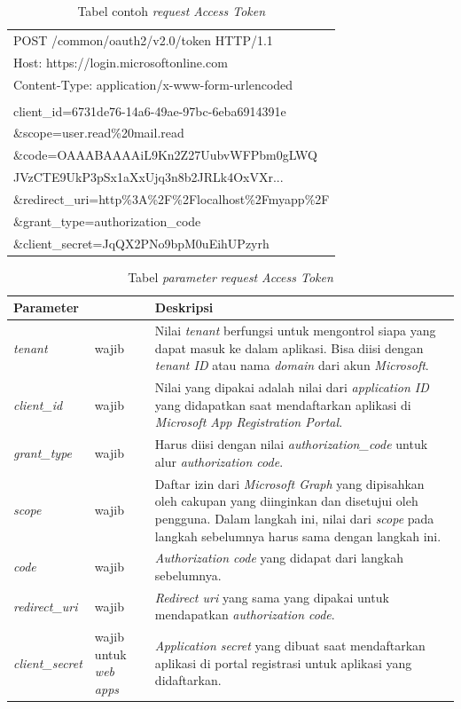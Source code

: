 \begin{table}[H]
	\centering 
	\caption{Tabel contoh \textit{request} \textit{Access Token}}
	\label{tab:contoh_request_access_token}
	\begin{tabular}{|p{12cm}|}
	\toprule
	POST /common/oauth2/v2.0/token HTTP/1.1\\
Host: https://login.microsoftonline.com\\
Content-Type: application/x-www-form-urlencoded\\
\\
client\_id=6731de76-14a6-49ae-97bc-6eba6914391e\\
\&scope=user.read\%20mail.read\\
\&code=OAAABAAAAiL9Kn2Z27UubvWFPbm0gLWQ\\
JVzCTE9UkP3pSx1aXxUjq3n8b2JRLk4OxVXr...\\
\&redirect\_uri=http\%3A\%2F\%2Flocalhost\%2Fmyapp\%2F\\
\&grant\_type=authorization\_code\\
\&client\_secret=JqQX2PNo9bpM0uEihUPzyrh \\ 
	\bottomrule
	\end{tabular}  
\end{table}

\begin{table}[H]
	\centering 
	\caption{Tabel \textit{parameter} \textit{request} \textit{Access Token}}
	\label{tab:parameter_request_access_token}
	\begin{tabular}{|p{3cm}|p{3cm}|p{9cm}|}
	\toprule
	 \textbf{Parameter} & & \textbf{Deskripsi}\\ \hline 
	\textit{tenant} & wajib & Nilai \textit{tenant} berfungsi untuk mengontrol siapa yang dapat masuk ke dalam aplikasi. Bisa diisi dengan \textit{tenant ID} atau nama \textit{domain} dari akun \textit{Microsoft}.\\ \hline 
	\textit{client\_id} & wajib & Nilai yang dipakai adalah nilai dari \textit{application ID} yang didapatkan saat mendaftarkan aplikasi di \textit{Microsoft App Registration Portal}.\\ \hline 
	\textit{grant\_type} & wajib & Harus diisi dengan nilai \textit{authorization\_code} untuk alur \textit{authorization code}. \\ \hline
	\textit{scope} & wajib & Daftar izin dari \textit{Microsoft Graph} yang dipisahkan oleh cakupan yang diinginkan dan disetujui oleh pengguna. Dalam langkah ini, nilai dari \textit{scope} pada langkah sebelumnya harus sama dengan langkah ini.  \\ \hline 
	\textit{code} & wajib & \textit{Authorization code} yang didapat dari langkah sebelumnya. \\ \hline  
	\textit{redirect\_uri} & wajib & \textit{Redirect uri} yang sama yang dipakai untuk mendapatkan \textit{authorization code}. \\ \hline 
	\textit{client\_secret} & wajib untuk \textit{web apps} & \textit{Application secret} yang dibuat saat mendaftarkan aplikasi di portal registrasi untuk aplikasi yang didaftarkan.\\
	\bottomrule
	\end{tabular}  
\end{table}

